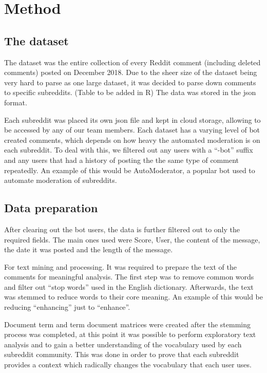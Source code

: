 \chapter{Method}\label{ch:Method}

\section{The dataset}

The dataset was the entire collection of every Reddit comment (including deleted comments) posted on December 2018. Due to the sheer size of the dataset being very hard to parse as one large dataset, it was decided to parse down comments to specific subreddits. (Table to be added in R)  The data was stored in the json format.

Each subreddit was placed its own json file and kept in cloud storage, allowing to be accessed by any of our team members. Each dataset has a varying level of bot created comments, which depends on how heavy the automated moderation is on each subreddit. To deal with this, we filtered out any users with a “-bot” suffix and any users that had a history of posting the the same type of comment repeatedly. An example of this would be AutoModerator, a popular bot used to automate moderation of subreddits. 

\section {Data preparation}
After clearing out the bot users, the data is further filtered out to only the required fields. The main ones used were Score, User, the content of the message, the date it was posted and the length of the message.

For text mining and processing. It was required to prepare the text of the comments for meaningful analysis. The first step was to remove common words and filter out “stop words” used in the English dictionary. Afterwards, the text was stemmed to reduce words to their core meaning. An example of this would be reducing “enhancing” just to “enhance”. 

Document term and term document matrices were created after the stemming process was completed, at this point it was possible to perform exploratory text analysis and to gain a better understanding of the vocabulary used by each subreddit community. This was done in order to prove that each subreddit provides a context which radically changes the vocabulary that each user uses.

